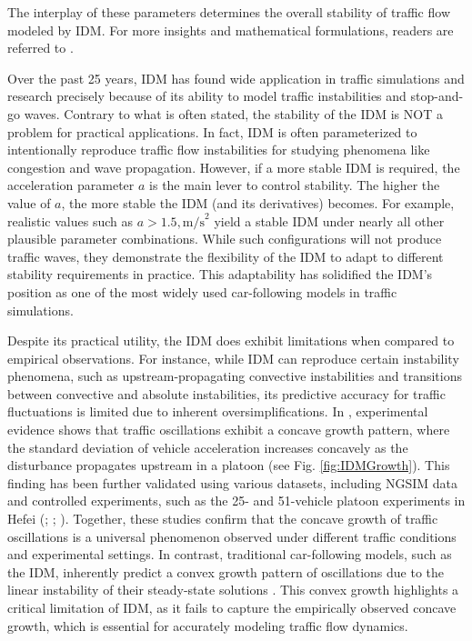 \documentclass[a4paper,fleqn]{cas-sc}
\begin{document}
The interplay of these parameters determines the overall stability of traffic flow modeled by IDM. For more insights and mathematical formulations, readers are referred to \cite{treiberTrafficFlowDynamics2013}.

Over the past 25 years, IDM has found wide application in traffic simulations and research precisely because of its ability to model traffic instabilities and stop-and-go waves. Contrary to what is often stated, the stability of the IDM is NOT a problem for practical applications. In fact, IDM is often parameterized to intentionally reproduce traffic flow instabilities for studying phenomena like congestion and wave propagation. However, if a more stable IDM is required, the acceleration parameter $a$ is the main lever to control stability. The higher the value of $a$, the more stable the IDM (and its derivatives) becomes. For example, realistic values such as $a > 1.5 , \text{m/s}^2$ yield a stable IDM under nearly all other plausible parameter combinations. While such configurations will not produce traffic waves, they demonstrate the flexibility of the IDM to adapt to different stability requirements in practice. This adaptability has solidified the IDM's position as one of the most widely used car-following models in traffic simulations.

Despite its practical utility, the IDM does exhibit limitations when compared to empirical observations. For instance, while IDM can reproduce certain instability phenomena, such as upstream-propagating convective instabilities and transitions between convective and absolute instabilities, its predictive accuracy for traffic fluctuations is limited due to inherent oversimplifications. In \cite{jiangTrafficExperimentRevealsNature2014}, experimental evidence shows that traffic oscillations exhibit a concave growth pattern, where the standard deviation of vehicle acceleration increases concavely as the disturbance propagates upstream in a platoon (see Fig. \ref{fig:IDMGrowth}). This finding has been further validated using various datasets, including NGSIM data and controlled experiments, such as the 25- and 51-vehicle platoon experiments in Hefei (\cite{jiangExperimentalFeaturesCarfollowingBehavior2015}; \cite{tianEmpiricalAnalysisSimulationConcave2016}; \cite{tianCellularAutomatonModelSimulating2016}). Together, these studies confirm that the concave growth of traffic oscillations is a universal phenomenon observed under different traffic conditions and experimental settings. In contrast, traditional car-following models, such as the IDM, inherently predict a convex growth pattern of oscillations due to the linear instability of their steady-state solutions \citep{wangStabilityAnalysisStochasticLinear2020}. This convex growth highlights a critical limitation of IDM, as it fails to capture the empirically observed concave growth, which is essential for accurately modeling traffic flow dynamics.
\end{document}
